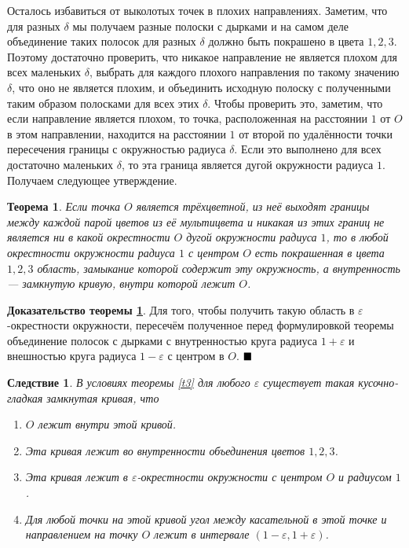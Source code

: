 \documentclass[12pt,a4paper]{article}
\newtheorem{theorem}{Теорема}
\newtheorem{corollary}{Следствие}[theorem]
\renewcommand{\qed}{$\blacksquare \vspace{5mm}$}
\begin{document}
Осталось избавиться от выколотых точек в плохих направлениях. Заметим, что для разных $\delta$ мы получаем разные полоски с дырками и на самом деле объединение таких полосок для разных $\delta$ должно быть покрашено в цвета $1, 2, 3$. Поэтому достаточно проверить, что никакое направление не является плохом для всех маленьких $\delta$, выбрать для каждого плохого направления по такому значению $\delta$, что оно не является плохим, и объединить исходную полоску с полученными таким образом полосками для всех этих $\delta$. Чтобы проверить это, заметим, что если направление является плохом, то точка, расположенная на расстоянии $1$ от $O$ в этом направлении, находится на расстоянии $1$ от второй по удалённости точки пересечения границы с окружностью радиуса $\delta$. Если это выполнено для всех достаточно маленьких $\delta$, то эта граница является дугой окружности радиуса $1$. Получаем следующее утверждение.

\begin{theorem} \label{t5}
	Если точка $O$ является трёхцветной, из неё выходят границы между каждой парой цветов из её мультицвета и никакая из этих границ не является ни в какой окрестности $O$ дугой окружности радиуса $1$, то в любой окрестности окружности радиуса $1$ с центром $O$ есть покрашенная в цвета $1, 2, 3$ область, замыкание которой содержит эту окружность, а внутренность --- замкнутую кривую, внутри которой лежит $O$.  
\end{theorem}


\textbf{Доказательство теоремы \ref{t5}}. Для того, чтобы получить такую область в $\varepsilon$-окрестности окружности, пересечём полученное перед формулировкой теоремы объединение полосок с дырками с внутренностью круга радиуса $1+\varepsilon$ и внешностью круга радиуса $1-\varepsilon$ с центром в $O$. \qed

\begin{corollary} \label{f3.1}
	В условиях теоремы \ref{t3} для любого $\varepsilon$ существует такая кусочно-гладкая замкнутая кривая, что
	\begin{enumerate}
		\item $O$ лежит внутри этой кривой.
		\item Эта кривая лежит во внутренности объединения цветов $1, 2, 3$.
		\item Эта кривая лежит в $\varepsilon$-окрестности окружности с центром $O$ и радиусом $1$.
		\item Для любой точки на этой кривой угол между касательной в этой точке и направлением на точку $O$ лежит в интервале $(1 - \varepsilon, 1 + \varepsilon)$.
	\end{enumerate}
\end{corollary}
\end{document}
